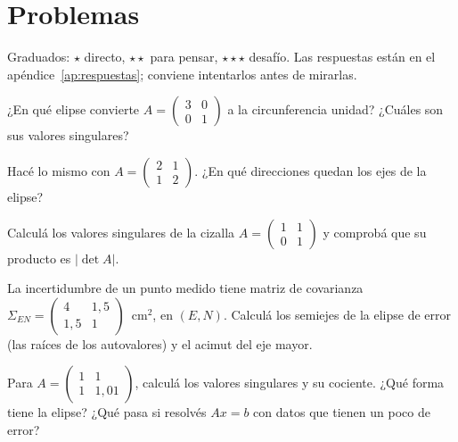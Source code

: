 \section{Problemas}\label{sec:problemas-08}

Graduados: \({\star}\) directo, \({\star}{\star}\) para pensar, \({\star}{\star}{\star}\) desafío. Las respuestas están en el apéndice~\ref{ap:respuestas}; conviene intentarlos antes de mirarlas.

\begin{problema}[\({\star}\)]\label{pb:08-1}
¿En qué elipse convierte \(A=\begin{pmatrix}3&0\\0&1\end{pmatrix}\) a la circunferencia unidad? ¿Cuáles son sus valores singulares?
\end{problema}

\begin{problema}[\({\star}{\star}\)]\label{pb:08-2}
Hacé lo mismo con \(A=\begin{pmatrix}2&1\\1&2\end{pmatrix}\). ¿En qué direcciones quedan los ejes de la elipse?
\end{problema}

\begin{problema}[\({\star}{\star}\)]\label{pb:08-3}
Calculá los valores singulares de la cizalla \(A=\begin{pmatrix}1&1\\0&1\end{pmatrix}\) y comprobá que su producto es \(|\det A|\).
\end{problema}

\begin{problema}[\({\star}{\star}\)]\label{pb:08-4}
La incertidumbre de un punto medido tiene matriz de covarianza \(\Sigma_{EN}=\begin{pmatrix}4&1{,}5\\1{,}5&1\end{pmatrix}\)~cm\(^2\), en \((E,N)\). Calculá los semiejes de la elipse de error (las raíces de los autovalores) y el acimut del eje mayor.
\end{problema}

\begin{problema}[\({\star}{\star}{\star}\)]\label{pb:08-5}
Para \(A=\begin{pmatrix}1&1\\1&1{,}01\end{pmatrix}\), calculá los valores singulares y su cociente. ¿Qué forma tiene la elipse? ¿Qué pasa si resolvés \(Ax=b\) con datos que tienen un poco de error?
\end{problema}
